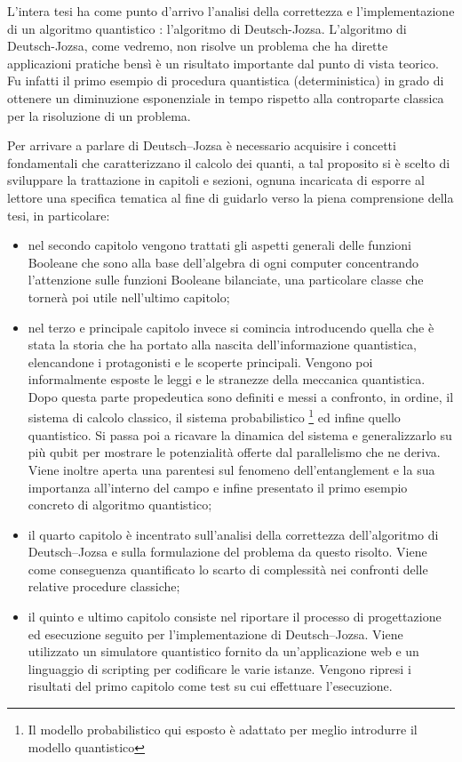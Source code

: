 \documentclass[12pt,a4paper,openright]{report}
\begin{document}
L'intera tesi ha come punto d'arrivo l'analisi della correttezza e l'implementazione di un algoritmo quantistico : l'algoritmo di Deutsch-Jozsa. L'algoritmo di Deutsch-Jozsa, come vedremo, non risolve un problema che ha dirette applicazioni
pratiche bensì è un risultato importante dal punto di vista teorico. Fu infatti il primo esempio di procedura quantistica (deterministica) in grado di ottenere un diminuzione esponenziale in tempo rispetto alla controparte
classica per la risoluzione di un problema.\par
Per arrivare a parlare di Deutsch–Jozsa è necessario acquisire i concetti fondamentali che caratterizzano il calcolo dei quanti, a tal proposito si è scelto
di sviluppare la trattazione in capitoli e sezioni, ognuna incaricata di esporre al lettore una specifica tematica al fine di guidarlo verso la piena comprensione della tesi,
in particolare:     
\begin{itemize}
    \item nel secondo capitolo vengono trattati gli aspetti generali delle funzioni Booleane che sono alla base dell'algebra di ogni computer concentrando l'attenzione
          sulle funzioni Booleane bilanciate, una particolare classe che tornerà poi utile nell'ultimo capitolo;

    \item nel terzo e principale capitolo invece si comincia introducendo quella che è stata la storia che ha portato alla nascita dell'informazione quantistica,
          elencandone i protagonisti e le scoperte principali. Vengono poi informalmente esposte le leggi e le stranezze della meccanica quantistica. Dopo 
          questa parte propedeutica sono definiti e messi a confronto, in ordine, il sistema di calcolo classico, il sistema probabilistico \footnote{Il modello probabilistico
          qui esposto è adattato per meglio introdurre il modello quantistico} ed infine quello quantistico. Si passa poi a ricavare la dinamica del sistema e generalizzarlo
          su più qubit per mostrare le potenzialità offerte dal parallelismo che ne deriva. Viene inoltre aperta una parentesi sul fenomeno dell'entanglement
          e la sua importanza all'interno del campo e infine presentato il primo esempio concreto di algoritmo quantistico;
    
    \item il quarto capitolo è incentrato sull'analisi della correttezza dell'algoritmo di Deutsch–Jozsa e sulla formulazione del problema da questo risolto. Viene 
          come conseguenza quantificato lo scarto di complessità nei confronti delle relative procedure classiche;
          
    \item il quinto e ultimo capitolo consiste nel riportare il processo di progettazione ed esecuzione seguito per l'implementazione di Deutsch–Jozsa.
          Viene utilizzato un simulatore quantistico fornito da un'applicazione web e un linguaggio di scripting per codificare le varie istanze. Vengono ripresi
          i risultati del primo capitolo come test su cui effettuare l'esecuzione.
             
\end{itemize}     
\end{document}

